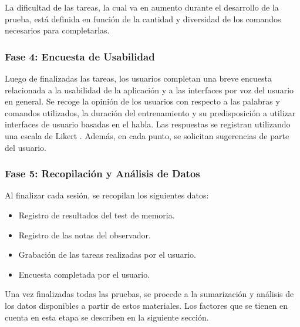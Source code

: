 La dificultad de las tareas, la cual va en aumento durante el desarrollo de la prueba, 
est\'a definida en funci\'on de la cantidad y diversidad de los comandos necesarios para completarlas.

\subsubsection{Fase 4: Encuesta de Usabilidad}
Luego de finalizadas las tareas, los usuarios completan una breve encuesta relacionada a la usabilidad de
la aplicaci\'on y a las interfaces por voz del usuario en general.
Se recoge la opini\'on de los usuarios con respecto a las palabras y comandos utilizados, la duraci\'on del
entrenamiento y su predisposici\'on a utilizar interfaces de usuario basadas en el habla. Las respuestas se
registran utilizando una escala de Likert \cite{Allen:2007}.
Adem\'as, en cada punto, se solicitan sugerencias de parte del usuario. 	

\subsubsection{Fase 5: Recopilaci\'on y An\'alisis de Datos} 
Al finalizar cada sesi\'on, se recopilan los siguientes datos:
	\begin{itemize}			
		\item Registro de resultados del test de memoria.
		\item Registro de las notas del observador.
		\item Grabaci\'on de las tareas realizadas por el usuario.
		\item Encuesta completada por el usuario.
	\end{itemize}

Una vez finalizadas todas las pruebas, se procede a la sumarizaci\'on y an\'alisis de los datos disponibles
a partir de estos materiales. Los factores que se tienen en cuenta en esta etapa se describen en la
siguiente secci\'on.

